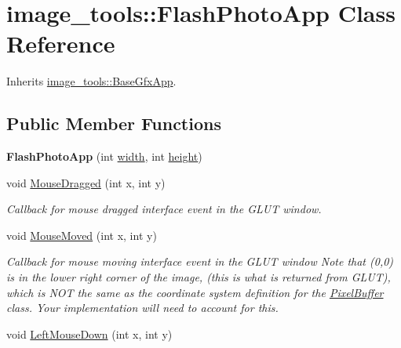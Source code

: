 \hypertarget{classimage__tools_1_1FlashPhotoApp}{}\section{image\+\_\+tools\+:\+:Flash\+Photo\+App Class Reference}
\label{classimage__tools_1_1FlashPhotoApp}


Inherits \hyperlink{classimage__tools_1_1BaseGfxApp}{image\+\_\+tools\+::\+Base\+Gfx\+App}.

\subsection*{Public Member Functions}
\begin{DoxyCompactItemize}
\item 
{\bfseries Flash\+Photo\+App} (int \hyperlink{classimage__tools_1_1BaseGfxApp_a2fe403c5392f624477c2ce4429f1a7b5}{width}, int \hyperlink{classimage__tools_1_1BaseGfxApp_aa961e13a7a8e6062204223cc33ac7503}{height})\hypertarget{classimage__tools_1_1FlashPhotoApp_ae86078388c8a06bae8e708ed15ea4638}{}\label{classimage__tools_1_1FlashPhotoApp_ae86078388c8a06bae8e708ed15ea4638}

\item 
void \hyperlink{classimage__tools_1_1FlashPhotoApp_abe6a6b7ac7664639d5208affe277f6ee}{Mouse\+Dragged} (int x, int y)\hypertarget{classimage__tools_1_1FlashPhotoApp_abe6a6b7ac7664639d5208affe277f6ee}{}\label{classimage__tools_1_1FlashPhotoApp_abe6a6b7ac7664639d5208affe277f6ee}

\begin{DoxyCompactList}\small\item\em Callback for mouse dragged interface event in the G\+L\+UT window. \end{DoxyCompactList}\item 
void \hyperlink{classimage__tools_1_1FlashPhotoApp_abac618c1f5a236dc678674de050cd205}{Mouse\+Moved} (int x, int y)\hypertarget{classimage__tools_1_1FlashPhotoApp_abac618c1f5a236dc678674de050cd205}{}\label{classimage__tools_1_1FlashPhotoApp_abac618c1f5a236dc678674de050cd205}

\begin{DoxyCompactList}\small\item\em Callback for mouse moving interface event in the G\+L\+UT window Note that (0,0) is in the lower right corner of the image, (this is what is returned from G\+L\+UT), which is N\+OT the same as the coordinate system definition for the \hyperlink{classimage__tools_1_1PixelBuffer}{Pixel\+Buffer} class. Your implementation will need to account for this. \end{DoxyCompactList}\item 
void \hyperlink{classimage__tools_1_1FlashPhotoApp_a6ad65b17915b17d539bf82fb07710c7f}{Left\+Mouse\+Down} (int x, int y)\hypertarget{classimage__tools_1_1FlashPhotoApp_a6ad65b17915b17d539bf82fb07710c7f}{}\label{classimage__tools_1_1FlashPhotoApp_a6ad65b17915b17d539bf82fb07710c7f}


\end{DoxyCompactItemize}
